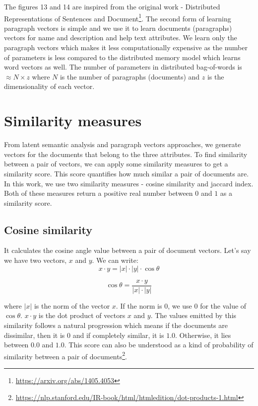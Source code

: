 The figures 13 and 14 are inspired from the original work - 
Distributed Representations of Sentences and Document\footnote{\label{pv}\url{https://arxiv.org/abs/1405.4053}}. The second form of learning paragraph vectors is simple and we use it to learn documents (paragraphs) vectors for name and description and help text attributes. We learn only the paragraph vectors which makes it less computationally expensive \cite{DBLP:journals/corr/LeM14} as the number of parameters is less compared to the distributed memory model which learns word vectors as well. The number of parameters in distributed bag-of-words is $\approx N \times z$ where $N$ is the number of paragraphs (documents) and $z$ is the dimensionality of each vector.

\section{Similarity measures}
From latent semantic analysis and paragraph vectors approaches, we generate vectors for the documents that belong to the three attributes. To find similarity between a pair of vectors, we can apply some similarity measures to get a similarity score. This score quantifies how much similar a pair of documents are. In this work, we use two similarity measures - cosine similarity and jaccard index. Both of these measures return a positive real number between $0$ and $1$ as a similarity score.

\subsection{Cosine similarity}
It calculates the cosine angle value between a pair of document vectors. Let's say we have two vectors, $x$ and $y$. We can write:
\begin{equation}
x \cdot y = |x| \cdot |y| \cdot \cos{\theta}
\end{equation}

\begin{equation}
\cos{\theta} = \frac {x \cdot y}{|x| \cdot |y|} 
\end{equation}

where $|x|$ is the norm of the vector $x$. If the norm is $0$, we use $0$ for the value of $\cos{\theta}$. $x \cdot y$ is the dot product of vectors $x$ and $y$. The values emitted by this similarity follows a natural progression which means if the documents are dissimilar, then it is $0$ and if completely similar, it is $1.0$. Otherwise, it lies between $0.0$ and $1.0$. This score can also be understood as a kind of probability of similarity between a pair of documents\footnote{\url{https://nlp.stanford.edu/IR-book/html/htmledition/dot-products-1.html}}.


